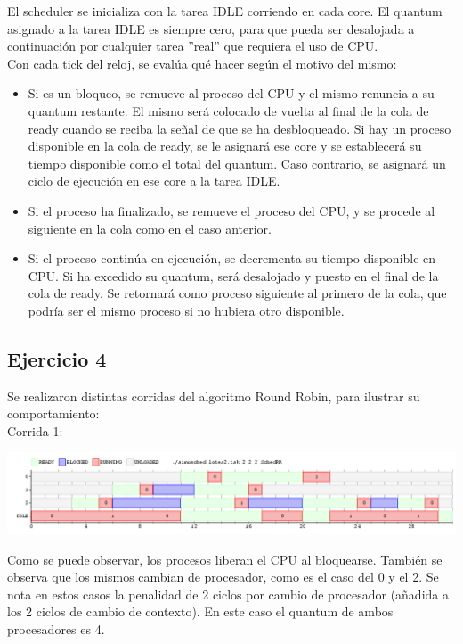 El scheduler se inicializa con la tarea IDLE corriendo en cada core. El quantum asignado a la tarea IDLE es siempre cero, para que pueda ser desalojada a continuación por cualquier tarea ''real'' que requiera el uso de CPU. \\

Con cada tick del reloj, se evalúa qué hacer según el motivo del mismo: 
\begin{itemize}
	\item Si es un bloqueo, se remueve al proceso del CPU y el mismo renuncia a su quantum restante. El mismo será colocado de vuelta al final de la cola de ready cuando se reciba la señal de que se ha desbloqueado. Si hay un proceso disponible en la cola de ready, se le asignará ese core y se establecerá su tiempo disponible como el total del quantum. Caso contrario, se asignará un ciclo de ejecución en ese core a la tarea IDLE.
	\item Si el proceso ha finalizado, se remueve el proceso del CPU, y se procede al siguiente en la cola como  en el caso anterior.
	\item Si el proceso continúa en ejecución, se decrementa su tiempo disponible en CPU. Si ha excedido su quantum, será desalojado y puesto en el final de la cola de ready. Se retornará como proceso siguiente al primero de la cola, que podría ser el mismo proceso si no hubiera otro disponible.
\end{itemize}

\subsection{Ejercicio 4}

Se realizaron distintas corridas del algoritmo Round Robin, para ilustrar su comportamiento: \\

\noindent
Corrida 1:


\begin{center}
\includegraphics[scale=0.4]{graficos/rr_lotes2.png}
\end{center}

Como se puede observar, los procesos liberan el CPU al bloquearse. También se observa que los mismos cambian de procesador, como es el caso del 0 y el 2. Se nota en estos casos la penalidad de 2 ciclos por cambio de procesador (añadida a los 2 ciclos de cambio de contexto).  En este caso el quantum de ambos procesadores es 4. \\

